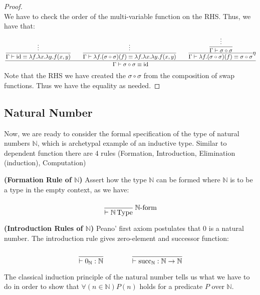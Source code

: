\begin{dem}
\begin{proof}
\begin{equation*}
    \end{equation*}
    \todo We have to check the order of the multi-variable function on the RHS. Thus, we have that:
    \begin{equation*}
        \cfrac{\cfrac{\vdots}{\Gamma\vdash\operatorname{id}\equiv\lambda f.\lambda x.\lambda y.f(x, y)}\qquad\cfrac{\vdots}{\Gamma\vdash \lambda f.(\sigma\circ\sigma)(f)\equiv\lambda f.\lambda x.\lambda y.f(x, y)}\qquad\cfrac{\cfrac{\vdots}{\Gamma\vdash \sigma\circ\sigma}}{\Gamma\vdash \lambda f.(\sigma\circ\sigma)(f)\equiv \sigma\circ\sigma}\eta}{\Gamma\vdash\sigma\circ\sigma\equiv\operatorname{id}}
    \end{equation*}
    Note that the RHS we have created the $\sigma\circ\sigma$ from the composition of swap functions. Thus we have the equality as needed.
\end{proof}
\end{dem}

\subsection{Natural Number}

Now, we are ready to consider the formal specification of the type of natural numbers $\mathbb{N}$, which is archetypal example of an inductive type. Similar to dependent function there are 4 rules (Formation, Introduction, Elimination (induction), Computation)

\begin{definition}{\textbf{(Formation Rule of $\mathbb{N}$)}}
    Assert how the type $\mathbb{N}$ can be formed where $\mathbb{N}$ is to be a type in the empty context, as we have:
    \begin{equation*}
        \cfrac{}{\vdash \mathbb{N}\type}\ \mathbb{N}\text{-form}
    \end{equation*}
\end{definition}

\begin{definition}{\textbf{(Introduction Rules of $\mathbb{N}$)}}
    Peano' first axiom postulates that $0$ is a natural number. The introduction rule gives zero-element and successor function:
    \begin{equation*}
        \cfrac{}{\vdash0_\mathbb{N}:\mathbb{N}} \qquad\qquad \cfrac{}{\vdash\operatorname{succ}_\mathbb{N}:\mathbb{N}\rightarrow\mathbb{N}}
    \end{equation*}
\end{definition}

The classical induction principle of the natural number tells us what we have to do in order to show that $\forall(n\in\mathbb{N})P(n)$ holds for a predicate $P$ over $\mathbb{N}$. 

